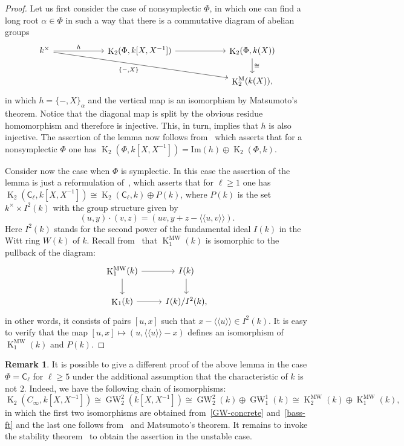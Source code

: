 \documentclass[oneside, 8pt]{amsart}
\theoremstyle{remark}
\theoremstyle{definition}
\numberwithin{lemma}{section}
\numberwithin{prop}{section}
\numberwithin{corollary}{section}
\numberwithin{externaltheorem}{section}
\newtheorem{rem}[lemma]{Remark}
\DeclareMathOperator{\K}{K}
\DeclareMathOperator{\GW}{GW}
\newcommand{\inv}{^{-1}}
\newcommand{\rC}{\mathsf{C}}
\numberwithin{equation}{section}
\begin{document}
\begin{proof} Let us first consider the case of nonsymplectic $\Phi$, in which one can find a long root $\alpha\in \Phi$ in such a way that there is a commutative diagram of abelian groups
\[\begin{tikzcd}[column sep=5pc] k^\times \arrow{drr}[swap]{\{-, X\}} \arrow{r}{h}  & \K_2(\Phi, k[X, X^{-1}]) \arrow{r} & \K_2(\Phi, k(X)) \arrow{d}{\cong} \\
 & & \K_2^\mathrm{M}(k(X)), \end{tikzcd}\]
in which $h = \{ -, X \}_{\alpha}$ and the vertical map is an isomorphism by Matsumoto's theorem.
Notice that the diagonal map is split by the obvious residue homomorphism and therefore is injective. This, in turn, implies that $h$ is also injective.
The assertion of the lemma now follows from~\cite[Satz~3]{Hur77} which asserts that for a nonsymplectic $\Phi$ one has $\K_2(\Phi, k[X, X\inv]) = \mathrm{Im}(h) \oplus \K_2(\Phi, k)$.

Consider now the case when $\Phi$ is symplectic. In this case the assertion of the lemma is just a reformulation of~\cite[Theorem~B]{MR91},
which asserts that for $\ell \geq 1$ one has $\K_2(\rC_\ell, k[X, X\inv]) \cong \K_2(\rC_\ell, k) \oplus P(k)$, where
$P(k)$ is the set $k^\times \times I^2(k)$ with the group structure given by
\[ (u, y) \cdot (v, z) = (uv, y + z - \langle\langle u, v\rangle\rangle).\]
Here $I^2(k)$ stands for the second power of the fundamental ideal $I(k)$ in the Witt ring $W(k)$ of $k$.
Recall from~\cite{Mo04} that $\K_1^\mathrm{MW}(k)$ is isomorphic to the pullback of the diagram:
\[ \begin{tikzcd} \K_1^\mathrm{MW}(k) \arrow{r} \arrow{d} & I(k) \arrow{d} \\ \K_1(k) \arrow{r} & I(k)/I^2(k), \end{tikzcd} \]
in other words, it consists of pairs $[u, x]$ such that $x - \langle \langle u \rangle \rangle \in I^2(k)$.
It is easy to verify that the map $[u, x] \mapsto (u, \langle\langle u \rangle\rangle - x)$ defines an isomorphism of $\K_1^\mathrm{MW}(k)$ and $P(k)$. \end{proof}

\begin{rem} It is possible to give a different proof of the above lemma in the case $\Phi = \rC_\ell$ for $\ell \geq 5$ under the additional assumption that the characteristic of $k$ is not $2$. Indeed, we have the following chain of isomorphisms:
\begin{equation} \K_2(C_\infty, k[X, X^{-1}]) \cong \GW_2^2(k[X,X^{-1}]) \cong \GW_2^2(k) \oplus \GW_1^1(k) \cong \K_2^\mathrm{MW}(k) \oplus \K_1^\mathrm{MW}(k),\end{equation}
in which the first two isomorphisms are obtained from~\eqref{GW-concrete} and~\cref{bass-ft} and the last one follows from~\cite[Lemma~4.1.1]{AF17} and Matsumoto's theorem.
It remains to invoke the stability theorem~\cite[Theorem~9.4]{Pa89} to obtain the assertion in the unstable case. \end{rem}
\end{document}
